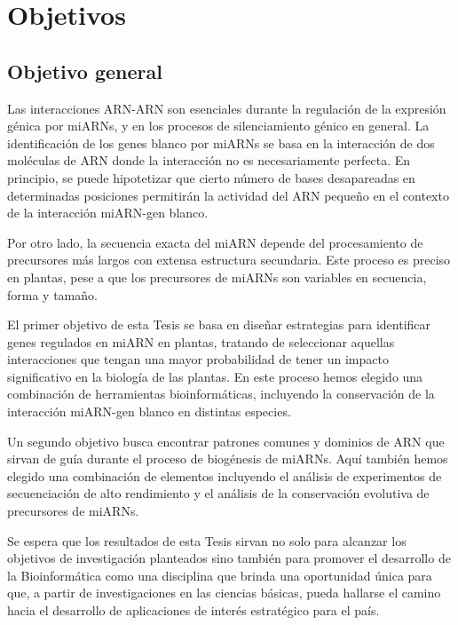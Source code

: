 \setcounter{chapter}{2}
\chapter*{Objetivos} 
\setcounter{figure}{0}
\setcounter{table}{0}
\setcounter{section}{0}

\section{Objetivo general} 

Las interacciones ARN-ARN son esenciales durante la regulación de la expresión génica por miARNs, y en los procesos de silenciamiento génico en general.
La identificación de los genes blanco por miARNs se basa en la interacción de dos moléculas de ARN donde la interacción no es necesariamente perfecta. 
En principio, se puede hipotetizar que cierto número de bases desapareadas en determinadas posiciones permitirán la actividad del ARN pequeño en el contexto de la interacción miARN-gen blanco. 

Por otro lado, la secuencia exacta del miARN depende del procesamiento de precursores más largos con extensa estructura secundaria.
Este proceso es preciso en plantas, pese a que los precursores de miARNs son variables en secuencia, forma y tamaño.

El primer objetivo de esta Tesis se basa en diseñar estrategias para identificar genes regulados en miARN en plantas, tratando de seleccionar aquellas interacciones que tengan una mayor probabilidad de tener un impacto significativo en la biología de las plantas.
En este proceso hemos elegido una combinación de herramientas bioinformáticas, incluyendo la conservación de la interacción miARN-gen blanco en distintas especies.

Un segundo objetivo busca encontrar patrones comunes y dominios de ARN que sirvan de guía durante el proceso de biogénesis de miARNs.
Aquí también hemos elegido una combinación de elementos incluyendo el análisis de experimentos de secuenciación de alto rendimiento y el análisis de la conservación evolutiva de precursores de miARNs.

Se espera que los resultados de esta Tesis sirvan no solo para alcanzar los objetivos de investigación planteados sino también para promover el desarrollo de la Bioinformática como una disciplina que brinda una oportunidad única para que, a partir de investigaciones en las ciencias básicas, pueda hallarse el camino hacia el desarrollo de aplicaciones de interés estratégico para el país.

